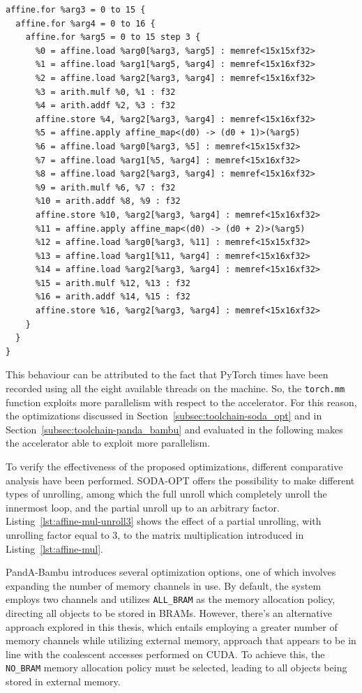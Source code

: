 \begin{lstlisting}[label={lst:affine-mul-unroll3}, caption=Unrolled matrix multiplication in affine dialect with unrolling factor 3]
affine.for %arg3 = 0 to 15 {
  affine.for %arg4 = 0 to 16 {
    affine.for %arg5 = 0 to 15 step 3 {
      %0 = affine.load %arg0[%arg3, %arg5] : memref<15x15xf32>
      %1 = affine.load %arg1[%arg5, %arg4] : memref<15x16xf32>
      %2 = affine.load %arg2[%arg3, %arg4] : memref<15x16xf32>
      %3 = arith.mulf %0, %1 : f32
      %4 = arith.addf %2, %3 : f32
      affine.store %4, %arg2[%arg3, %arg4] : memref<15x16xf32>
      %5 = affine.apply affine_map<(d0) -> (d0 + 1)>(%arg5)
      %6 = affine.load %arg0[%arg3, %5] : memref<15x15xf32>
      %7 = affine.load %arg1[%5, %arg4] : memref<15x16xf32>
      %8 = affine.load %arg2[%arg3, %arg4] : memref<15x16xf32>
      %9 = arith.mulf %6, %7 : f32
      %10 = arith.addf %8, %9 : f32
      affine.store %10, %arg2[%arg3, %arg4] : memref<15x16xf32>
      %11 = affine.apply affine_map<(d0) -> (d0 + 2)>(%arg5)
      %12 = affine.load %arg0[%arg3, %11] : memref<15x15xf32>
      %13 = affine.load %arg1[%11, %arg4] : memref<15x16xf32>
      %14 = affine.load %arg2[%arg3, %arg4] : memref<15x16xf32>
      %15 = arith.mulf %12, %13 : f32
      %16 = arith.addf %14, %15 : f32
      affine.store %16, %arg2[%arg3, %arg4] : memref<15x16xf32>
    }
  }
}
\end{lstlisting}

This behaviour can be attributed to the fact that PyTorch times have been recorded using all the eight available threads on the machine.
So, the \lstinline{torch.mm} function exploits more parallelism with respect to the accelerator.
For this reason, the optimizations discussed in Section~\ref{subsec:toolchain-soda_opt} and in Section~\ref{subsec:toolchain-panda_bambu} and evaluated in the following makes the accelerator able to exploit more parallelism.

To verify the effectiveness of the proposed optimizations, different comparative analysis have been performed.
SODA-OPT offers the possibility to make different types of unrolling, among which the full unroll which completely unroll the innermost loop, and the partial unroll up to an arbitrary factor.
Listing~\ref{lst:affine-mul-unroll3} shows the effect of a partial unrolling, with unrolling factor equal to 3, to the matrix multiplication introduced in Listing~\ref{lst:affine-mul}.

PandA-Bambu introduces several optimization options, one of which involves expanding the number of memory channels in use.
By default, the system employs two channels and utilizes \lstinline{ALL_BRAM} as the memory allocation policy, directing all objects to be stored in BRAMs.
However, there's an alternative approach explored in this thesis, which entails employing a greater number of memory channels while utilizing external memory, approach that appears to be in line with the coalescent accesses performed on CUDA.
To achieve this, the \lstinline{NO_BRAM} memory allocation policy must be selected, leading to all objects being stored in external memory.

